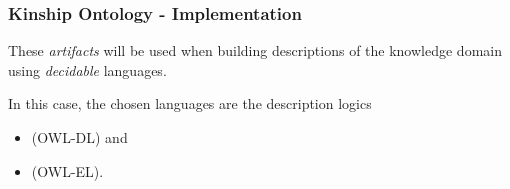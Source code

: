 \documentclass[8pt]{beamer}
\newcommand{\relative}{\mathtt{relativeOf}}
\newcommand{\child}{\mathtt{childOf}}
\newcommand{\parent}{\mathtt{parentOf}}
\newcommand{\ancestor}{\mathtt{ancestorOf}}
\newcommand{\descendant}{\mathtt{descendantOf}}
\newcommand{\Alice}{A}
\newcommand{\Bob}{B}
\begin{document}
\begin{frame}
\end{frame}

\begin{frame}
\frametitle{Kinship Ontology - Implementation}
  
  These \emph{artifacts} will be used when building descriptions
  of the knowledge domain using \emph{decidable} languages.
  \vspace{\baselineskip}

  In this case, the chosen languages are the description logics
  \begin{center}
    \begin{itemize}
      \item {\Large\sroiq (OWL-DL)} and %
      \item {\Large\elplusplus (OWL-EL)}.
    \end{itemize}
  \end{center}
\end{frame}
\end{document}
